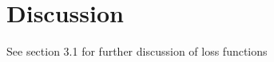 \documentclass[12pt]{article}
\newcommand{\ra}[1]{\renewcommand{\arraystretch}{#1}}
\theoremstyle{definition}
\begin{document}

\section{Discussion}

See \citet{pourahmadi2011covariance} section 3.1 for further discussion of loss functions
\end{document}
